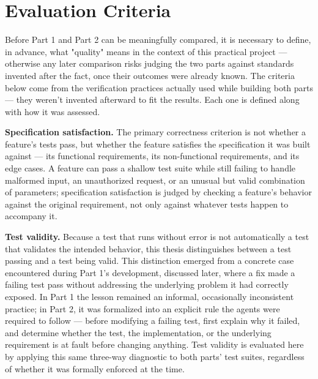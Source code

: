 \section{Evaluation Criteria}

Before Part 1 and Part 2 can be meaningfully compared, it is necessary to define, in advance, what "quality" means in the context of this practical project --- otherwise any later comparison risks judging the two parts against standards invented after the fact, once their outcomes were already known. The criteria below come from the verification practices actually used while building both parts --- they weren't invented afterward to fit the results. Each one is defined along with how it was assessed.

\textbf{Specification satisfaction.} The primary correctness criterion is not whether a feature's tests pass, but whether the feature satisfies the specification it was built against --- its functional requirements, its non-functional requirements, and its edge cases. A feature can pass a shallow test suite while still failing to handle malformed input, an unauthorized request, or an unusual but valid combination of parameters; specification satisfaction is judged by checking a feature's behavior against the original requirement, not only against whatever tests happen to accompany it.

\textbf{Test validity.} Because a test that runs without error is not automatically a test that validates the intended behavior, this thesis distinguishes between a test passing and a test being valid. This distinction emerged from a concrete case encountered during Part 1's development, discussed later, where a fix made a failing test pass without addressing the underlying problem it had correctly exposed. In Part 1 the lesson remained an informal, occasionally inconsistent practice; in Part 2, it was formalized into an explicit rule the agents were required to follow --- before modifying a failing test, first explain why it failed, and determine whether the test, the implementation, or the underlying requirement is at fault before changing anything. Test validity is evaluated here by applying this same three-way diagnostic to both parts' test suites, regardless of whether it was formally enforced at the time.


